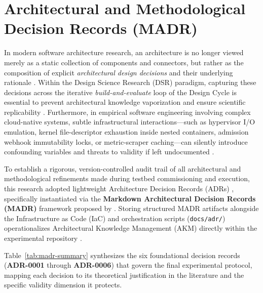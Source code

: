 \section{Architectural and Methodological Decision Records (MADR)}
\label{sec:madr-decisions}

In modern software architecture research, an architecture is no longer viewed merely as a static collection of components and connectors, but rather as the composition of explicit \textit{architectural design decisions} and their underlying rationale \cite{jansen_2005, capilla_2016, Tang_Razavian_Paech_Hesse_2017}. Within the Design Science Research (DSR) paradigm, capturing these decisions across the iterative \textit{build-and-evaluate} loop of the Design Cycle is essential to prevent architectural knowledge vaporization and ensure scientific replicability \cite{hevner_2007, dresch_2015}. Furthermore, in empirical software engineering involving complex cloud-native systems, subtle infrastructural interactions---such as hypervisor I/O emulation, kernel file-descriptor exhaustion inside nested containers, admission webhook immutability locks, or metric-scraper caching---can silently introduce confounding variables and threats to validity if left undocumented \cite{wohlin_2012, verdecchia_2023}.

To establish a rigorous, version-controlled audit trail of all architectural and methodological refinements made during testbed commissioning and execution, this research adopted lightweight Architecture Decision Records (ADRs) \cite{nygard_2011}, specifically instantiated via the \textbf{Markdown Architectural Decision Records (MADR)} framework proposed by . Storing structured MADR artifacts alongside the Infrastructure as Code (IaC) and orchestration scripts (\texttt{docs/adr/}) operationalizes Architectural Knowledge Management (AKM) directly within the experimental repository \cite{capilla_2016, kopp_2018}.

Table~\ref{tab:madr-summary} synthesizes the six foundational decision records (\textbf{ADR-0001} through \textbf{ADR-0006}) that govern the final experimental protocol, mapping each decision to its theoretical justification in the literature and the specific validity dimension it protects.



